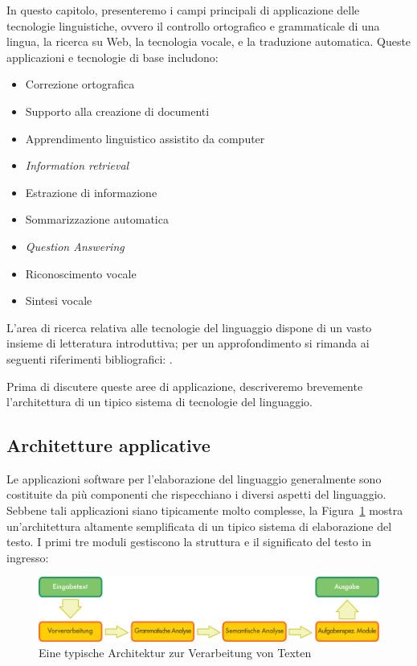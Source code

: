 \documentclass[]{../../metanetpaper}
\begin{document}
\begin{multicols}{2}
In questo capitolo, presenteremo i campi principali di applicazione delle
tecnologie linguistiche, ovvero il controllo ortografico e grammaticale di una
lingua, la ricerca su Web, la tecnologia vocale, e la traduzione automatica.
Queste applicazioni e tecnologie di base includono:


\begin{itemize}
\item Correzione ortografica
\item Supporto alla creazione di documenti
\item Apprendimento linguistico assistito da computer
\item \emph{Information retrieval}
\item Estrazione di informazione
\item Sommarizzazione automatica
\item \emph{Question Answering}
\item Riconoscimento vocale 
\item Sintesi vocale
\end{itemize}


L'area di ricerca relativa alle tecnologie del linguaggio dispone
di un vasto insieme di letteratura introduttiva; per un approfondimento 
si rimanda ai seguenti riferimenti bibliografici:  
\cite{carstensen-etal1, jurafsky-martin01, manning-schuetze1,  lt-world1, lt-survey1}.

Prima di discutere queste aree di applicazione, descriveremo brevemente
l'architettura di un tipico sistema di tecnologie del linguaggio.




\subsection{Architetture applicative}

Le applicazioni software per l'elaborazione del linguaggio generalmente sono
costituite da pi\`{u} componenti che rispecchiano i diversi aspetti del
linguaggio. Sebbene tali applicazioni siano tipicamente molto complesse, la 
Figura~\ref{fig:textprocessingarch_de} mostra un'architettura altamente 
semplificata di un tipico sistema di elaborazione del testo. I primi tre
moduli gestiscono la struttura e il significato del testo in ingresso:


\begin{figure}[htb]
  \center
  \includegraphics[width=\textwidth]{../_media/german/text_processing_app_architecture}
  \caption{Eine typische Architektur zur Verarbeitung von Texten}
  \label{fig:textprocessingarch_de}
\end{figure}




\end{multicols}
\end{document}
